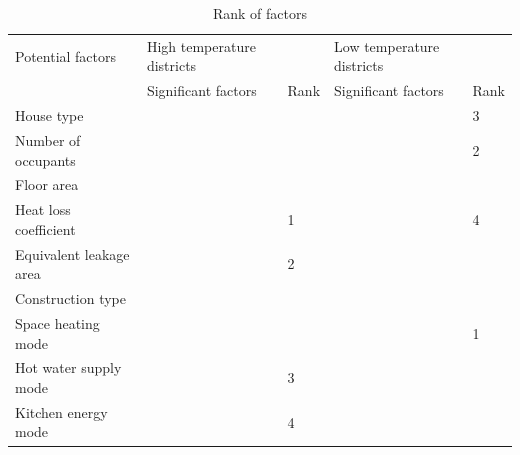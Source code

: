 \documentclass[12pt]{article}
\newcommand{\cmark}{\ding{51}}%
\begin{document}
\begin{table}[h!]
\centering
\caption{Rank of factors}
\label{tab:rank}
\begin{tabular}{l|p{3cm}|l|p{3cm}|l}
  \hline
Potential factors       & High temperature districts &                           & Low temperature districts& \\
                        & Significant factors        & Rank                      & Significant factors & Rank \\
  \hline
  \hline
House type              &                            &                           & \cmark              & 3    \\
  \hline
Number of occupants     &                            &                           & \cmark              & 2    \\
  \hline
Floor area              &                            &                           &                     &      \\
  \hline
Heat loss coefficient   & \cmark                     & 1                         & \cmark              & 4    \\
  \hline
Equivalent leakage area & \cmark                     & 2                         &                     &      \\
  \hline
Construction type       &                            &                           &                     &      \\
  \hline
Space heating mode      &                            &                           & \cmark              & 1    \\
  \hline
Hot water supply mode   & \cmark                     & 3                         &                     &      \\
  \hline
Kitchen energy mode     & \cmark                     & 4                         &                     &      \\
  \hline
\end{tabular}
\end{table}
\end{document}

